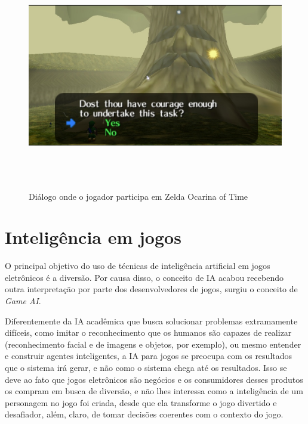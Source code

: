 \begin{figure}
\centering
\includegraphics [height=10cm]{figuras/exemplo_dialogo_zelda.jpg}
\caption{Diálogo onde o jogador participa em Zelda Ocarina of Time}
\label{zelda}
\end{figure}



\section{Inteligência em jogos}

O principal objetivo do uso de técnicas de inteligência artificial em jogos eletrônicos é a diversão. Por causa disso, o conceito de IA acabou recebendo outra interpretação por parte dos desenvolvedores de jogos, surgiu o conceito de \textit{Game AI}.

Diferentemente da IA acadêmica que busca solucionar problemas extramamente difíceis, como imitar o reconhecimento que os humanos são capazes de realizar (reconhecimento facial e de imagens e objetos, por exemplo), ou mesmo entender e construir agentes inteligentes, a IA para jogos se preocupa com os resultados que o sistema irá gerar, e não como o sistema chega até os resultados. Isso se deve ao fato que jogos eletrônicos são negócios e os consumidores desses produtos os compram em busca de diversão, e não lhes interessa como a inteligência de um personagem no jogo foi criada, desde que ela transforme o jogo divertido e desafiador, além, claro, de tomar decisões coerentes com o contexto do jogo.

